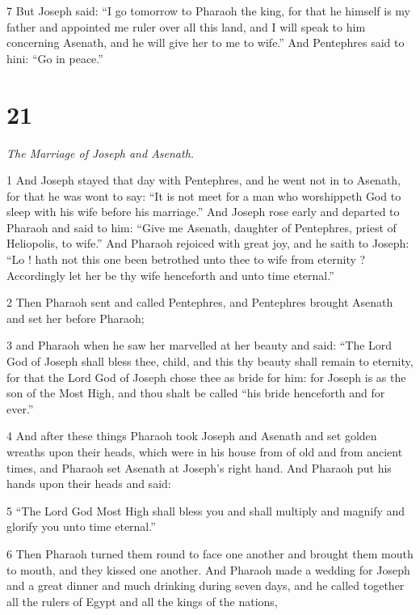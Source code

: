 \par 7 But Joseph said: “I go tomorrow to Pharaoh the king, for that he himself is my father and appointed me ruler over all this land, and I will speak to him concerning Asenath, and he will give her to me to wife.” And Pentephres said to hini: “Go in peace.” 

\chapter{21}

\par \textit{The Marriage of Joseph and Asenath.}

\par 1 And Joseph stayed that day with Pentephres, and he went not in to Asenath, for that he was wont to say: “It is not meet for a man who worshippeth God to sleep with his wife before his marriage.” And Joseph rose early and departed to Pharaoh and said to him: “Give me Asenath, daughter of Pentephres, priest of Heliopolis, to wife.” And Pharaoh rejoiced with great joy, and he saith to Joseph: “Lo ! hath not this one been betrothed unto thee to wife from eternity ? Accordingly let her be thy wife henceforth and unto time eternal.” 

\par 2 Then Pharaoh sent and called Pentephres, and Pentephres brought Asenath and set her before Pharaoh; 

\par 3 and Pharaoh when he saw her marvelled at her beauty and said: “The Lord God of Joseph shall bless thee, child, and this thy beauty shall remain to eternity, for that the Lord God of Joseph chose thee as bride for him: for Joseph is as the son of the Most High, and thou shalt be called “his bride henceforth and for ever.” 

\par 4 And after these things Pharaoh took Joseph and Asenath and set golden wreaths upon their heads, which were in his house from of old and from ancient times, and Pharaoh set Asenath at Joseph's right hand. And Pharaoh put his hands upon their heads and said: 

\par 5 “The Lord God Most High shall bless you and shall multiply and magnify and glorify you unto time eternal.” 

\par 6 Then Pharaoh turned them round to face one another and brought them mouth to mouth, and they kissed one another. And Pharaoh made a wedding for Joseph and a great dinner and much drinking during seven days, and he called together all the rulers of Egypt and all the kings of the nations, 

